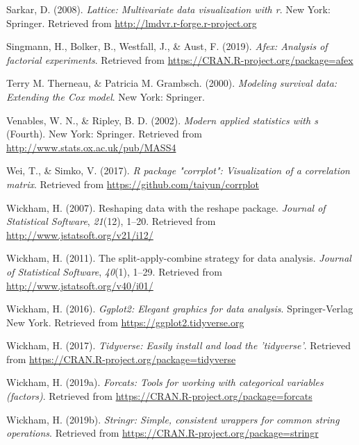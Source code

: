 \documentclass[man]{apa6}
\begin{document}
\leavevmode\hypertarget{ref-R-lattice}{}%
Sarkar, D. (2008). \emph{Lattice: Multivariate data visualization with r}. New York: Springer. Retrieved from \url{http://lmdvr.r-forge.r-project.org}

\leavevmode\hypertarget{ref-R-afex}{}%
Singmann, H., Bolker, B., Westfall, J., \& Aust, F. (2019). \emph{Afex: Analysis of factorial experiments}. Retrieved from \url{https://CRAN.R-project.org/package=afex}

\leavevmode\hypertarget{ref-R-survival-book}{}%
Terry M. Therneau, \& Patricia M. Grambsch. (2000). \emph{Modeling survival data: Extending the Cox model}. New York: Springer.

\leavevmode\hypertarget{ref-R-MASS}{}%
Venables, W. N., \& Ripley, B. D. (2002). \emph{Modern applied statistics with s} (Fourth). New York: Springer. Retrieved from \url{http://www.stats.ox.ac.uk/pub/MASS4}

\leavevmode\hypertarget{ref-R-corrplot2017}{}%
Wei, T., \& Simko, V. (2017). \emph{R package "corrplot": Visualization of a correlation matrix}. Retrieved from \url{https://github.com/taiyun/corrplot}

\leavevmode\hypertarget{ref-R-reshape2}{}%
Wickham, H. (2007). Reshaping data with the reshape package. \emph{Journal of Statistical Software}, \emph{21}(12), 1--20. Retrieved from \url{http://www.jstatsoft.org/v21/i12/}

\leavevmode\hypertarget{ref-R-plyr}{}%
Wickham, H. (2011). The split-apply-combine strategy for data analysis. \emph{Journal of Statistical Software}, \emph{40}(1), 1--29. Retrieved from \url{http://www.jstatsoft.org/v40/i01/}

\leavevmode\hypertarget{ref-R-ggplot2}{}%
Wickham, H. (2016). \emph{Ggplot2: Elegant graphics for data analysis}. Springer-Verlag New York. Retrieved from \url{https://ggplot2.tidyverse.org}

\leavevmode\hypertarget{ref-R-tidyverse}{}%
Wickham, H. (2017). \emph{Tidyverse: Easily install and load the 'tidyverse'}. Retrieved from \url{https://CRAN.R-project.org/package=tidyverse}

\leavevmode\hypertarget{ref-R-forcats}{}%
Wickham, H. (2019a). \emph{Forcats: Tools for working with categorical variables (factors)}. Retrieved from \url{https://CRAN.R-project.org/package=forcats}

\leavevmode\hypertarget{ref-R-stringr}{}%
Wickham, H. (2019b). \emph{Stringr: Simple, consistent wrappers for common string operations}. Retrieved from \url{https://CRAN.R-project.org/package=stringr}
\end{document}
